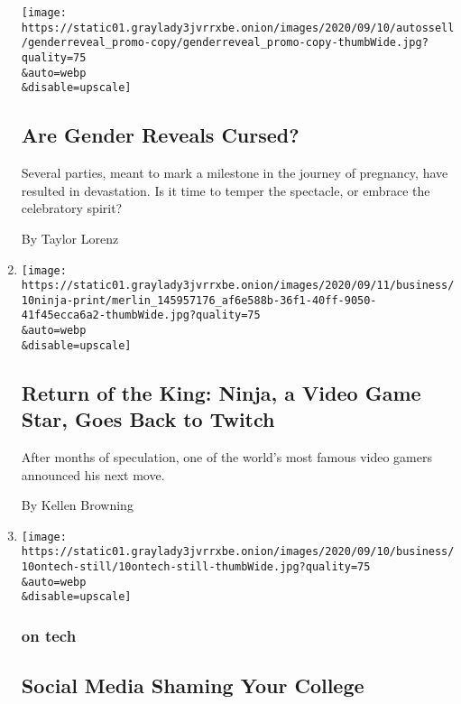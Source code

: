 \begin{enumerate}
  \texttt{[image: https://static01.graylady3jvrrxbe.onion/images/2020/09/10/autossell/genderreveal\_promo-copy/genderreveal\_promo-copy-thumbWide.jpg?quality=75\\\&auto=webp\\\&disable=upscale]}

  \hypertarget{are-gender-reveals-cursed}{%
  \subsection{Are Gender Reveals
  Cursed?}\label{are-gender-reveals-cursed}}

  Several parties, meant to mark a milestone in the journey of
  pregnancy, have resulted in devastation. Is it time to temper the
  spectacle, or embrace the celebratory spirit?

  By Taylor Lorenz
\item
  \href{/2020/09/10/business/ninja-stream-twitch.html}{}

  \texttt{[image: https://static01.graylady3jvrrxbe.onion/images/2020/09/11/business/10ninja-print/merlin\_145957176\_af6e588b-36f1-40ff-9050-41f45ecca6a2-thumbWide.jpg?quality=75\\\&auto=webp\\\&disable=upscale]}

  \hypertarget{return-of-the-king-ninja-a-video-game-star-goes-back-to-twitch}{%
  \subsection{Return of the King: Ninja, a Video Game Star, Goes Back to
  Twitch}\label{return-of-the-king-ninja-a-video-game-star-goes-back-to-twitch}}

  After months of speculation, one of the world's most famous video
  gamers announced his next move.

  By Kellen Browning
\item
  \href{/2020/09/10/technology/coronavirus-quarantines-college.html}{}

  \texttt{[image: https://static01.graylady3jvrrxbe.onion/images/2020/09/10/business/10ontech-still/10ontech-still-thumbWide.jpg?quality=75\\\&auto=webp\\\&disable=upscale]}

  \hypertarget{on-tech-1}{%
  \subsubsection{on tech}\label{on-tech-1}}

  \hypertarget{social-media-shaming-your-college}{%
  \subsection{Social Media Shaming Your
  College}\label{social-media-shaming-your-college}}


\end{enumerate}
